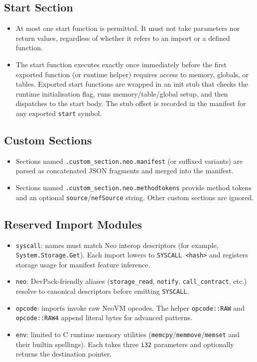 \documentclass[11pt]{article}
\begin{document}
\subsection{Start Section}
\begin{itemize}[nosep]
    \item At most one start function is permitted. It must not take parameters nor return values, regardless of whether it refers to an import or a defined function.
    \item The start function executes exactly once immediately before the first exported function (or runtime helper) requires access to memory, globals, or tables. Exported start functions are wrapped in an init stub that checks the runtime initialisation flag, runs memory/table/global setup, and then dispatches to the start body. The stub offset is recorded in the manifest for any exported \texttt{start} symbol.
\end{itemize}

\subsection{Custom Sections}
\begin{itemize}[nosep]
    \item Sections named \texttt{.custom\_section.neo.manifest} (or suffixed variants) are parsed as concatenated JSON fragments and merged into the manifest.
    \item Sections named \texttt{.custom\_section.neo.methodtokens} provide method tokens and an optional \texttt{source}/\texttt{nefSource} string. Other custom sections are ignored.
\end{itemize}

\subsection{Reserved Import Modules}
\begin{itemize}[nosep]
    \item \texttt{syscall}: names must match Neo interop descriptors (for example, \texttt{System.Storage.Get}). Each import lowers to \texttt{SYSCALL <hash>} and registers storage usage for manifest feature inference.
    \item \texttt{neo}: DevPack-friendly aliases (\texttt{storage\_read}, \texttt{notify}, \texttt{call\_contract}, etc.) resolve to canonical descriptors before emitting \texttt{SYSCALL}.
    \item \texttt{opcode}: imports invoke raw NeoVM opcodes. The helper \texttt{opcode::RAW} and \texttt{opcode::RAW4} append literal bytes for advanced patterns.
    \item \texttt{env}: limited to C runtime memory utilities (\texttt{memcpy}/\texttt{memmove}/\texttt{memset} and their builtin spellings). Each takes three \texttt{i32} parameters and optionally returns the destination pointer.
\end{itemize}
\end{document}
